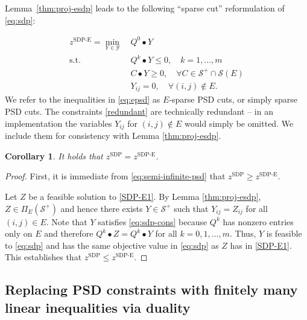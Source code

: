 \documentclass[twoside]{article}
\newtheorem{corollary}[thm]{Corollary}
\newcommand{\matip}[2]{#1 \bullet #2}
\begin{document}
	
	Lemma~\eqref{thm:proj-esdp} leads to the following ``sparse cut'' reformulation of \eqref{eq:sdp}:
	
	\begin{subequations}\label{SDP-E1}\begin{align}
			z^{\text{SDP-E}}=\min_{Y \in \mathcal{Y}} \ & \matip{Q^0}{Y}  \\
			\text{s.t. } & \matip{Q^k}{Y}  \leq 0, \quad k=1,\ldots, m \label{SDP-E1-b}\\
			& \matip{C}{Y} \geq 0, \quad \forall C \in \mathcal{S}^+ \cap \mathcal{S}(E) \label{eq:epsd} \\
			& Y_{ij} = 0, \quad \forall (i,j) \notin E. \label{redundant}
	\end{align}\end{subequations}
	We refer to the inequalities in \eqref{eq:epsd} as $E$-sparse PSD cuts, or simply sparse PSD cuts.
	The constraints \eqref{redundant} are technically redundant -- in an implementation the variables $Y_{ij}$ for $(i,j) \notin E$ would simply be omitted. We include them for consistency with Lemma \ref{thm:proj-esdp}.
	
	
	\begin{corollary} \label{thm-foo}
		It holds that $z^{\text{SDP}}=z^{\text{SDP-E}}$.
	\end{corollary}
	\begin{proof}
		First, it is immediate from \eqref{eq:semi-infinite-psd} that  $z^{\text{SDP}}\geq z^{\text{SDP-E}}$.
		
		Let $Z$ be a feasible solution to \eqref{SDP-E1}. By Lemma \ref{thm:proj-esdp}, $Z \in \Pi_E(\mathcal{S}^+)$ and hence there exists $Y \in \mathcal{S}^+$ such that  $Y_{ij} = Z_{ij}$ for all $(i,j) \in E$. Note that $Y$ satisfies \eqref{eq:sdp-cons} because $Q^k$ has nonzero entries only on $E$ and therefore
		$\matip{Q^k}{Z} = \matip{Q^k}{Y}$ for all $k=0,1,\ldots,m$.
		Thus,  $Y$ is feasible to \eqref{eq:sdp} and has the same objective value in \eqref{eq:sdp} as $Z$ has in \eqref{SDP-E1}. This establishes that  $z^{\text{SDP}}\leq z^{\text{SDP-E}}$. %
	\end{proof}
	
	
	\subsection{Replacing PSD constraints with finitely many linear inequalities via duality}
	\label{sec:replace_sdp_with_cuts_duality}
	
\end{document}

